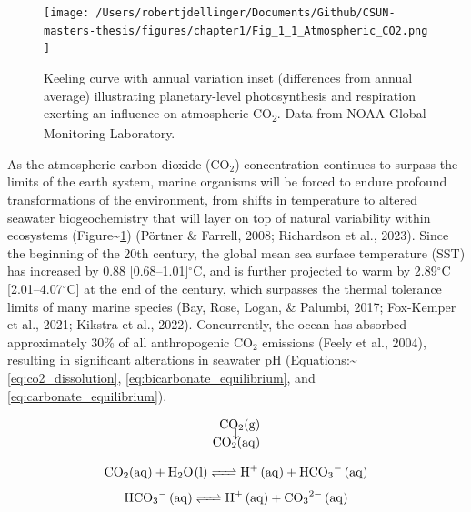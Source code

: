 \documentclass{CSUNthesis}
\begin{document}
\begin{figure}[ht]
  \centering
  \texttt{[image:  /Users/robertjdellinger/Documents/Github/CSUN-masters-thesis/figures/chapter1/Fig\_1\_1\_Atmospheric\_CO2.png ]}
  \caption[Monthly atmospheric CO\textsubscript{2} concentration (ppm), Mauna Loa Observatory, Hawaii (1958--2024).]{Keeling curve with annual variation inset (differences from annual average) illustrating planetary-level photosynthesis and respiration exerting an influence on atmospheric CO\textsubscript{2}. Data from NOAA Global Monitoring Laboratory.}
  \label{fig:atmospheric_co2}
\end{figure}

As the atmospheric carbon dioxide (CO\(_2\)) concentration continues to surpass the limits of the earth system, marine organisms will be forced to endure profound transformations of the environment, from shifts in temperature to altered seawater biogeochemistry that will layer on top of natural variability within ecosystems (Figure\textasciitilde{}\ref{fig:atmospheric_co2}) (Pörtner \& Farrell, 2008; Richardson et al., 2023). Since the beginning of the 20th century, the global mean sea surface temperature (SST) has increased by 0.88 {[}0.68--1.01{]}\(^\circ\)C, and is further projected to warm by 2.89\(^\circ\)C {[}2.01--4.07\(^\circ\)C{]} at the end of the century, which surpasses the thermal tolerance limits of many marine species (Bay, Rose, Logan, \& Palumbi, 2017; Fox-Kemper et al., 2021; Kikstra et al., 2022). Concurrently, the ocean has absorbed approximately \(30\%\) of all anthropogenic CO\(_2\) emissions (Feely et al., 2004), resulting in significant alterations in seawater pH (Equations:\textasciitilde{}\ref{eq:co2_dissolution}, \ref{eq:bicarbonate_equilibrium}, and \ref{eq:carbonate_equilibrium}).

\begin{equation}
\begin{aligned}
\ce{CO2(g)} \\[-0.8em]
\ce{\downarrow} \ \ \ \ \ \\[-0.8em]
\ce{CO2(aq)}
\end{aligned}
\label{eq:co2_dissolution}
\end{equation}

\begin{equation}
\ce{CO2(aq) + H2O(l) <=> H+ (aq) + HCO3^- (aq)}
\label{eq:bicarbonate_equilibrium}
\end{equation}
\vspace{-\baselineskip}
\begin{equation}
\ce{HCO3^- (aq) <=> H+ (aq) + CO3^{2-} (aq)}
\label{eq:carbonate_equilibrium}
\end{equation}
\end{document}

